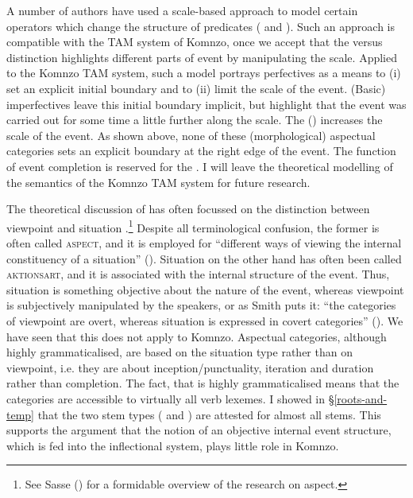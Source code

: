 A number of authors have used a scale-based approach to model certain operators which change the structure of predicates (\citealt{Kennedy:2005fy} and \citealt{Kubota:2010bx}). Such an approach is compatible with the TAM system of Komnzo, once we accept that the  versus  distinction highlights different parts of event by manipulating the  scale. Applied to the Komnzo TAM system, such a model portrays perfectives as a means to (i) set an explicit initial boundary and to (ii) limit the  scale of the event. (Basic) imperfectives leave this initial boundary implicit, but highlight that the event was carried out for some time \textendash{} a little further along the scale. The  () increases the  scale of the event. As shown above, none of these (morphological) aspectual categories sets an explicit boundary at the right edge of the event. The function of event completion is reserved for the  . I will leave the theoretical modelling of the semantics of the Komnzo TAM system for future research.%

The theoretical discussion of  has often focussed on the distinction between viewpoint  and situation .\footnote{See Sasse (\citeyear{Sasse:2002vn}) for a formidable overview of the research on aspect.} Despite all terminological confusion, the former is often called \textsc{aspect}, and it is employed for ``different ways of viewing the internal constituency of a situation'' (\citealt[3]{Comrie:1976vd}). Situation  on the other hand has often been called \textsc{aktionsart}, and it is associated with the internal structure of the event. Thus, situation  is something objective about the nature of the event, whereas viewpoint  is subjectively manipulated by the speakers, or as Smith puts it: ``the categories of viewpoint  are overt, whereas situation  is expressed in covert categories'' (\citeyear[5]{Smith:1997tq}). We have seen that this does not apply to Komnzo. Aspectual categories, although highly grammaticalised, are based on the situation type rather than on viewpoint, i.e. they are about inception/punctuality, iteration and duration rather than completion. The fact, that  is highly grammaticalised means that the categories are accessible to virtually all verb lexemes. I showed in \S{}\ref{roots-and-temp} that the two stem types (\Rs{} and \Ext{}) are attested for almost all stems. This supports the argument that the notion of an objective internal event structure, which is fed into the inflectional system, plays little role in Komnzo.%


